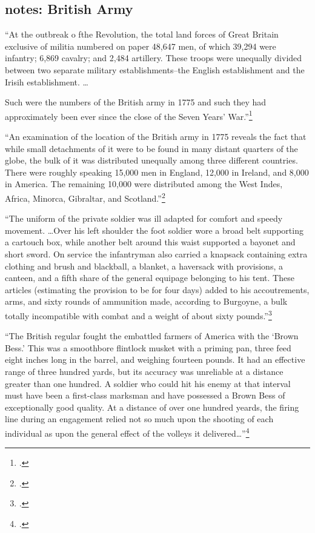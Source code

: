 \subsection{notes: British Army}

``At the outbreak o fthe Revolution, the total land forces of Great Britain
exclusive of militia numbered on paper 48,647 men, of which 39,294 were
infantry; 6,869 cavalry; and 2,484 artillery. These troops were unequally
divided between two separate military establishments--the English establishment
and the Irisih establishment. \ldots

Such were the numbers of the British army in 1775 and such they had
approximately been ever since the close of the Seven Years' War.''\footcite[1]{curtis_org_1972}

``An examination of the location of the British army in 1775 reveals the fact
that while small detachments of it were to be found in many distant quarters of
the globe, the bulk of it was distributed unequally among three different
countries. There were roughly speaking 15,000 men in England, 12,000 in
Ireland, and 8,000 in America. The remaining 10,000 were distributed among the
West Indes, Africa, Minorca, Gibraltar, and
Scotland.''\footcite[2]{curtis_org_1972}


``The uniform of the private soldier was ill adapted for comfort and speedy
movement. \ldots Over his left shoulder the foot soldier wore a broad belt
supporting a cartouch box, while another belt around this waist supported a
bayonet and short sword. On service the infantryman also carried a knapsack
containing extra clothing and brush and blackball, a blanket, a haversack with
provisions, a canteen, and a fifth share of the general equipage belonging to
his tent. These articles (estimating the provision to be for four days) added
to his accoutrements, arms, and sixty rounds of ammunition made, according to
Burgoyne, a bulk totally incompatible with combat and a weight of about sixty
pounds.''\footcite[14-15]{curtis_org_1972}

``The British regular fought the embattled farmers of America with the `Brown
Bess.' This was a smoothbore flintlock musket with a priming pan, three feed
eight inches long in the barrel, and weighing fourteen pounds. It had an
effective range of three hundred yards, but its accuracy was unreliable at a
distance greater than one hundred. A soldier who could hit his enemy at that
interval must have been a first-class marksman and have possessed a Brown Bess
of exceptionally good quality. At a distance of over one hundred yeards, the
firing line during an engagement relied not so much upon the shooting of each
individual as upon the general effect of the volleys it
delivered\ldots''\footcite[16]{curtis_org_1972}

